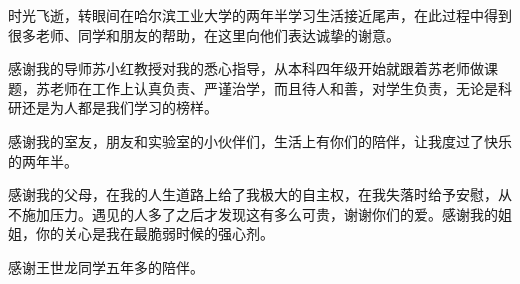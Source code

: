 \begin{acknowledgements}



时光飞逝，转眼间在哈尔滨工业大学的两年半学习生活接近尾声，在此过程中得到很多老师、同学和朋友的帮助，在这里向他们表达诚挚的谢意。

感谢我的导师苏小红教授对我的悉心指导，从本科四年级开始就跟着苏老师做课题，苏老师在工作上认真负责、严谨治学，而且待人和善，对学生负责，无论是科研还是为人都是我们学习的榜样。

感谢我的室友，朋友和实验室的小伙伴们，生活上有你们的陪伴，让我度过了快乐的两年半。

感谢我的父母，在我的人生道路上给了我极大的自主权，在我失落时给予安慰，从不施加压力。遇见的人多了之后才发现这有多么可贵，谢谢你们的爱。感谢我的姐姐，你的关心是我在最脆弱时候的强心剂。

感谢王世龙同学五年多的陪伴。

\end{acknowledgements}
